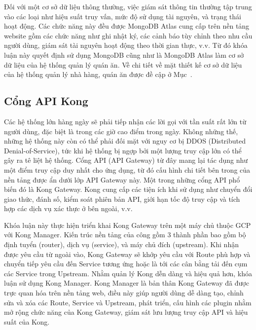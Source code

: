 Đối với một cơ sở dữ liệu thông thường, việc giám sát thông tin thường tập trung vào các loại như hiệu suất truy vấn, mức độ sử dụng tài nguyên, và trạng thái hoạt động.
Các chức năng này đều được MongoDB Atlas cung cấp trên nền tảng website gồm các chức năng như ghi nhật ký, các cảnh báo tùy chỉnh theo nhu cầu người dùng, giám sát tài nguyên hoạt động theo thời gian thực, v.v.
Từ đó khóa luận này quyết định sử dụng MongoDB cũng như là MongoDB Atlas làm cơ sở dữ liệu của hệ thống quản lý quán ăn.
Về chi tiết về mặt thiết kế cơ sở dữ liệu của hệ thống quản lý nhà hàng, quán ăn được đề cập ở Mục~.
\subsection{Cổng API Kong}
Các hệ thống lớn hàng ngày sẽ phải tiếp nhận các lời gọi với tần suất rất lớn từ người dùng, đặc biệt là trong các giờ cao điểm trong ngày.
Không những thế, những hệ thống này còn có thể phải đối mặt với nguy cơ bị DDOS (Distributed Denial-of-Service), tức khi hệ thống bị ngợp bởi một lượng truy cập lớn có thể gây ra tê liệt hệ thống.
Cổng API (API Gateway) từ đây mang lại tác dụng như một điểm truy cập duy nhất cho ứng dụng, từ đó cấu hình chi tiết bên trong của nền tảng được ẩn dưới lớp API Gateway này.
Một trong những cổng API phổ biến đó là Kong Gateway.
Kong cung cấp các tiện ích khi sử dụng như chuyển đổi giao thức, đánh số, kiểm soát phiên bản API, giới hạn tốc độ truy cập và tích hợp các dịch vụ xác thực ở bên ngoài, v.v.

Khóa luận này thực hiện triển khai Kong Gateway trên một máy chủ thuộc GCP với Kong Manager.
Kiến trúc nền tảng của công gồm 3 thành phần bao gồm bộ định tuyển (router), dịch vụ (service), và máy chủ đích (upstream).
Khi nhận được yêu cầu từ ngoài vào, Kong Gateway sẽ khớp yêu cầu với Route phù hợp và chuyển tiếp yêu cầu đến Service tương ứng hoặc là tới các cân bằng tải đến cụm các Service trong Upstream.
Nhằm quản lý Kong dễn dàng và hiệu quả hơn, khóa luận sử dụng Kong Manager.
Kong Manager là bản thân Kong Gateway đã được trực quan hóa trên nền tảng web, điều này giúp người dùng dễ dàng tạo, chỉnh sửa và xóa các Route, Service và Upstream, phát triển, cấu hình các plugin nhằm mở rộng chức năng của Kong Gateway, giám sát lưu lượng truy cập API và hiệu suất của Kong.
